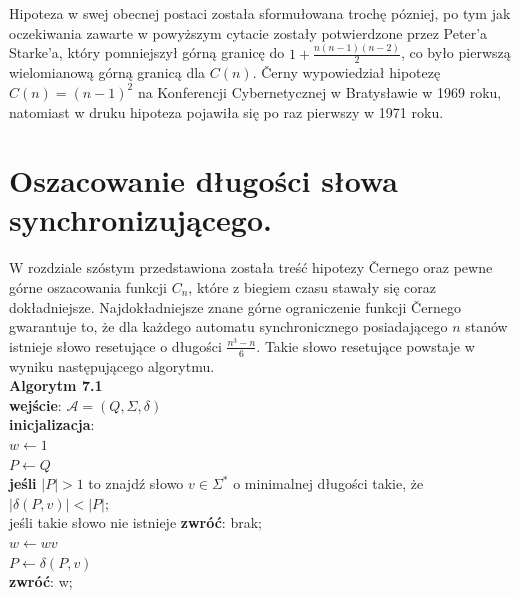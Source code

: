 \documentclass[12pt,a4paper]{article}
\begin{document}
Hipoteza w swej obecnej postaci zosta{\l}a sformu{\l}owana troch\k{e} p\'ozniej, po tym jak oczekiwania zawarte w powy\.zszym cytacie zosta{\l}y potwierdzone przez Peter'a Starke'a, kt\'ory pomniejszy{\l} g\'orn\k{a} granic\k{e} do $1+\frac{n(n-1)(n-2)}{2}$, co by{\l}o pierwsz\k{a} wielomianow\k{a} g\'orn\k{a} granic\k{a} dla $C(n)$. \v Cerny wypowiedzia{\l} hipotez\k{e} $C(n)=(n-1)^{2}$ na Konferencji Cybernetycznej  w Bratys{\l}awie w 1969 roku, natomiast w druku hipoteza pojawi{\l}a si\k{e} po raz pierwszy w 1971 roku.


\newpage
\section{Oszacowanie d{\l}ugo\'{s}ci s{\l}owa synchronizuj\k{a}cego.}

W rozdziale sz\'ostym przedstawiona zosta{\l}a tre\'s\'c hipotezy \v Cernego oraz pewne g\'orne oszacowania funkcji $C_{n}$, kt\'ore z  biegiem czasu stawa{\l}y si\k{e} coraz dok{\l}adniejsze. Najdok{\l}adniejsze znane g\'orne ograniczenie funkcji \v Cernego gwarantuje to, \.ze dla ka\.zdego automatu synchronicznego posiadaj\k{a}cego $n$ stan\'ow istnieje s{\l}owo resetuj\k{a}ce o d{\l}ugo\'sci $\frac{n^{3}-n}{6}$. Takie s{\l}owo resetuj\k{a}ce powstaje w wyniku nast\k{e}puj\k{a}cego algorytmu.\\


\textbf{Algorytm 7.1}\\ 
\textbf{wej\'scie}: $\mathscr{A}=(Q, \Sigma, \delta)$\\
\textbf{inicjalizacja}: \\
$w\leftarrow 1$\\ 
$P\leftarrow Q$\\
\textbf{je\'sli} $|P|>1$ to znajd\'z s{\l}owo $v\in\Sigma^{*}$ o minimalnej d{\l}ugo\'sci takie, \.ze $|\delta(P,v)|<|P|$;\\
je\'sli takie s{\l}owo nie istnieje \textbf{zwr\'o\'c}: brak;\\
$w\leftarrow wv$\\ 
$P\leftarrow \delta(P,v)$\\
\textbf{zwr\'o\'c}: w;\\
\end{document}
